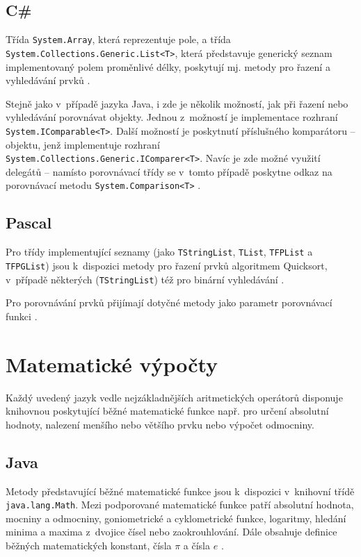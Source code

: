 \documentclass[czech,BP]{thesiskiv}
\begin{document}
\subsection{C\#}
Třída \texttt{System.Array}, která reprezentuje pole, a třída \texttt{System.Collections\-.Generic.List<T>}, která představuje generický seznam implementovaný polem proměnlivé délky, poskytují mj. metody pro řazení a vyhledávání prvků \cite{cs-guide-array, cs-guide-list}.\par
Stejně jako v~případě jazyka Java, i zde je několik možností, jak při řazení nebo vyhledávání porovnávat objekty. Jednou z~možností je implementace rozhraní \texttt{System.IComparable<T>}. Další možností je poskytnutí příslušného komparátoru -- objektu, jenž implementuje rozhraní \texttt{System.Collections\-.Generic.IComparer<T>}. Navíc je zde možné využití delegátů  --  namísto porovnávací třídy se v~tomto případě poskytne odkaz na porovnávací metodu \texttt{System.Comparison<T>} \cite{cs-guide-icomparable, cs-guide-icomparer, cs-guide-comparison}.

\subsection{Pascal}
Pro třídy implementující seznamy (jako \texttt{TStringList}, \texttt{TList}, \texttt{TFPList} a \texttt{TFPGList}) jsou k~dispozici metody pro řazení prvků algoritmem Quicksort, v~případě některých (\texttt{TStringList}) též pro binární vyhledávání \cite{pas-guide-tlistsort, pas-guide-tfplistsort}.\par
Pro porovnávání prvků přijímají dotyčné metody jako parametr porovnávací funkci \cite{pas-guide-tlistsortcompare}.

\section{Matematické výpočty}
Každý uvedený jazyk vedle nejzákladnějších aritmetických operátorů disponuje knihovnou poskytující běžné matematické funkce např. pro určení absolutní hodnoty, nalezení menšího nebo většího prvku nebo výpočet odmocniny.

\subsection{Java}
Metody představující běžné matematické funkce jsou k~dispozici v~knihovní třídě \texttt{java.lang.Math}. Mezi podporované matematické funkce patří absolutní hodnota, mocniny a odmocniny, goniometrické a cyklometrické funkce, logaritmy, hledání minima a maxima z~dvojice čísel nebo zaokrouhlování. Dále obsahuje definice běžných matematických konstant, čísla $\pi$ a čísla $e$ \cite{java-guide-math}.
\end{document}
